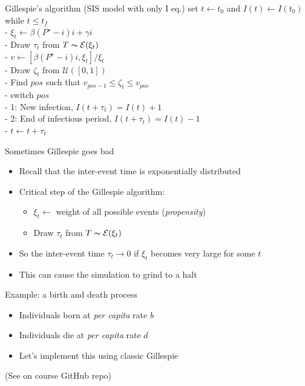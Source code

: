 \documentclass[aspectratio=169]{beamer}
\begin{document}
\begin{frame}{Gillespie's algorithm (SIS model with only I eq.)}
set $t\leftarrow t_0$ and $I(t)\leftarrow I(t_0)$\\
while {$t\leq t_f$}\\
- $\xi_t\leftarrow \beta (P^\star-i)i+\gamma i$\\
- Draw $\tau_t$ from $T\thicksim \mathcal{E}(\xi_t)$\\
- $v\leftarrow\left[\beta (P^\star-i)i,\xi_t\right]/\xi_t$\\
- Draw $\zeta_t$ from $\mathcal{U}([0,1])$\\
- Find $pos$ such that $v_{pos-1}\leq\zeta_t\leq v_{pos}$\\
- switch {$pos$}\\
\qquad - 1: New infection, $I(t+\tau_t)=I(t)+1$ \\
\qquad - 2: End of infectious period, $I(t+\tau_t)=I(t)-1$ \\
- $t\leftarrow t+\tau_t$
\end{frame}


\begin{frame}{Sometimes Gillespie goes bad}
    \begin{itemize}
        \item Recall that the inter-event time is exponentially distributed
        \item Critical step of the Gillespie algorithm:
        \begin{itemize}
            \item $\xi_t\leftarrow$ weight of all possible events (\emph{propensity})
            \item Draw $\tau_t$ from $T\thicksim \mathcal{E}(\xi_t)$
        \end{itemize}
        \item So the inter-event time $\tau_t\to 0$ if $\xi_t$ becomes very large for some $t$
        \item This can cause the simulation to grind to a halt
    \end{itemize}
\end{frame}


\begin{frame}{Example: a birth and death process}
    \begin{itemize}
        \item Individuals born at \emph{per capita} rate $b$
        \item Individuals die at \emph{per capita} rate $d$
        \item Let's implement this using classic Gillespie
    \end{itemize}
    \vfill
(See \href{https://raw.githubusercontent.com/julien-arino/3MC-course-epidemiological-modelling/main/CODE/simulate_birth_death_CTMC.R}{} on course GitHub repo)
\end{frame}
\end{document}
